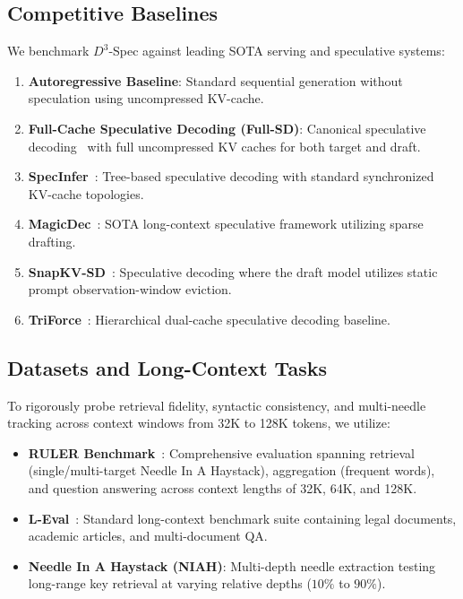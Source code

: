 \documentclass[runningheads]{llncs}
\begin{document}
\subsection{Competitive Baselines}
We benchmark $D^3$-Spec against leading SOTA serving and speculative systems:
\begin{enumerate}
    \item \textbf{Autoregressive Baseline}: Standard sequential generation without speculation using uncompressed KV-cache.
    \item \textbf{Full-Cache Speculative Decoding (Full-SD)}: Canonical speculative decoding~\cite{leviathan2023fast,chen2023accelerating} with full uncompressed KV caches for both target and draft.
    \item \textbf{SpecInfer}~\cite{miao2024specinfer}: Tree-based speculative decoding with standard synchronized KV-cache topologies.
    \item \textbf{MagicDec}~\cite{chen2024magicdec}: SOTA long-context speculative framework utilizing sparse drafting.
    \item \textbf{SnapKV-SD}~\cite{li2024snapkv}: Speculative decoding where the draft model utilizes static prompt observation-window eviction.
    \item \textbf{TriForce}~\cite{sun2024triforce}: Hierarchical dual-cache speculative decoding baseline.
\end{enumerate}

\subsection{Datasets and Long-Context Tasks}
To rigorously probe retrieval fidelity, syntactic consistency, and multi-needle tracking across context windows from 32K to 128K tokens, we utilize:
\begin{itemize}
    \item \textbf{RULER Benchmark}~\cite{hsieh2024ruler}: Comprehensive evaluation spanning retrieval (single/multi-target Needle In A Haystack), aggregation (frequent words), and question answering across context lengths of 32K, 64K, and 128K.
    \item \textbf{L-Eval}~\cite{an2024leval}: Standard long-context benchmark suite containing legal documents, academic articles, and multi-document QA.
    \item \textbf{Needle In A Haystack (NIAH)}: Multi-depth needle extraction testing long-range key retrieval at varying relative depths ($10\%$ to $90\%$).
\end{itemize}
\end{document}
